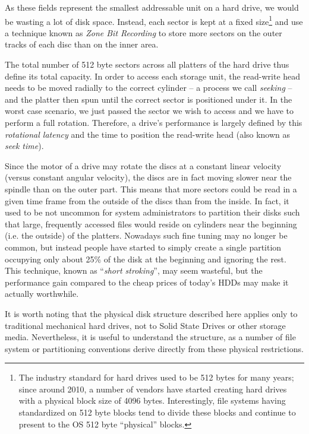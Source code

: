 As these fields represent the smallest addressable
unit on a hard drive, we would be wasting a lot of
disk space.  Instead, each sector is kept at a fixed
size\footnote{The industry standard for hard drives
used to be 512 bytes for many years; since around
2010, a number of vendors have started creating hard
drives with a physical block size of 4096 bytes.
Interestingly, file systems having standardized on 512
byte blocks tend to divide these blocks and continue
to present to the OS 512 byte ``physical'' blocks.}
and use a technique known as {\em Zone Bit
Recording} to store more
sectors on the outer tracks of each disc than on the
inner area.

The total number of 512 byte sectors across all
platters of the hard drive thus define its total
capacity.  In order to access each storage unit, the
read-write head needs to be moved radially to the
correct cylinder -- a process we call {\em seeking} --
and the platter then spun until the correct sector is
positioned under it.  In the worst case scenario, we
just passed the sector we wish to access and we have
to perform a full rotation.  Therefore, a drive's
performance is largely defined by this {\em rotational
latency} and the time to
position the read-write head (also known as {\em seek
time}).

Since the motor of a drive may rotate the discs at a
constant linear velocity (versus constant angular
velocity), the discs are in fact moving slower near
the spindle than on the outer part.  This means that
more sectors could be read in a given time frame from
the outside of the discs than from the inside.  In
fact, it used to be not uncommon for system
administrators to partition their disks such that
large, frequently accessed files would reside on
cylinders near the beginning (i.e. the outside) of the
platters.  Nowadays such fine tuning may no longer be
common, but instead people have started to simply
create a single partition occupying only about 25\% of
the disk at the beginning and ignoring the rest.  This
technique, known as ``{\em short stroking}'', may seem wasteful, but the performance
gain compared to the cheap prices of today's HDDs may
make it actually worthwhile.

It is worth noting that the physical disk structure
described here applies only to traditional mechanical
hard drives, not to Solid State Drives or other storage media.  Nevertheless, it
is useful to understand the structure, as a number of
file system or partitioning conventions derive
directly from these physical restrictions.

